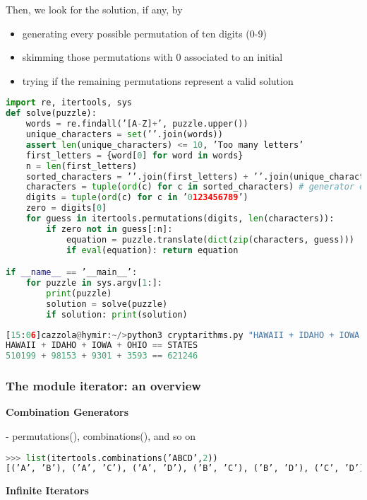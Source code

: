 Then, we look for the solution, if any, by
\begin{itemize}
	\item generating every possible permutation of ten digits (0-9)
	\item skimming those permutations with 0 associated to an initial
	\item  trying if the remaining permutations represent a valid solution
\end{itemize}

\begin{lstlisting}[language=Python]
import re, itertools, sys
def solve(puzzle):
	words = re.findall(’[A-Z]+’, puzzle.upper())
	unique_characters = set(’’.join(words))
	assert len(unique_characters) <= 10, ’Too many letters’
	first_letters = {word[0] for word in words}
	n = len(first_letters)
	sorted_characters = ’’.join(first_letters) + ’’.join(unique_characters-first_letters)
	characters = tuple(ord(c) for c in sorted_characters) # generator expression
	digits = tuple(ord(c) for c in ’0123456789’)
	zero = digits[0]
	for guess in itertools.permutations(digits, len(characters)):
		if zero not in guess[:n]:
			equation = puzzle.translate(dict(zip(characters, guess)))
			if eval(equation): return equation

if __name__ == ’__main__’:
	for puzzle in sys.argv[1:]:
		print(puzzle)
		solution = solve(puzzle)
		if solution: print(solution)
\end{lstlisting}

\begin{lstlisting}[language=Python]
[15:06]cazzola@hymir:~/>python3 cryptarithms.py "HAWAII + IDAHO + IOWA + OHIO == STATES"
HAWAII + IDAHO + IOWA + OHIO == STATES
510199 + 98153 + 9301 + 3593 == 621246
\end{lstlisting}

\subsubsection{The module iterator: an overview}

\textbf{Combination Generators}

- permutations(), combinations(), and so on

\begin{lstlisting}[language=Python]
>>> list(itertools.combinations(’ABCD’,2))
[(’A’, ’B’), (’A’, ’C’), (’A’, ’D’), (’B’, ’C’), (’B’, ’D’), (’C’, ’D’)]
\end{lstlisting}

\textbf{Infinite Iterators}

